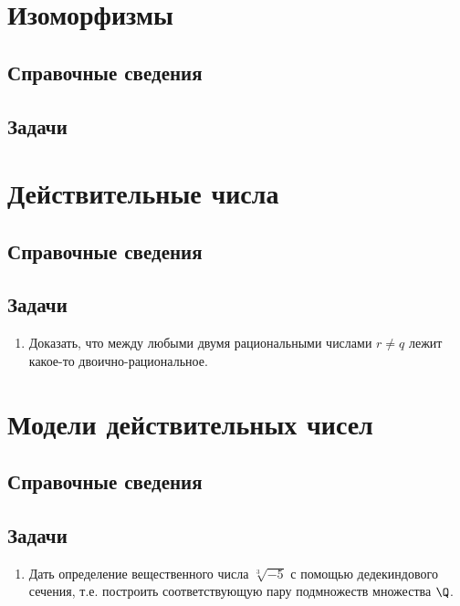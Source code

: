 \section{Изоморфизмы}

\subsection*{Справочные сведения}

\subsection*{Задачи}


\section{Действительные числа}

\subsection*{Справочные сведения}

\subsection*{Задачи}

\begin{enumerate}
\item Доказать, что между любыми двумя рациональными числами $r\ne q$ лежит какое-то двоично-рациональное.
\end{enumerate}


\section{Модели действительных чисел}

\subsection*{Справочные сведения}

\subsection*{Задачи}

\begin{enumerate}
\item Дать определение вещественного числа $\sqrt[3]{-5}$ с помощью дедекиндового сечения, т.е. построить соответствующую пару подмножеств множества $\Q$.
\end{enumerate}




